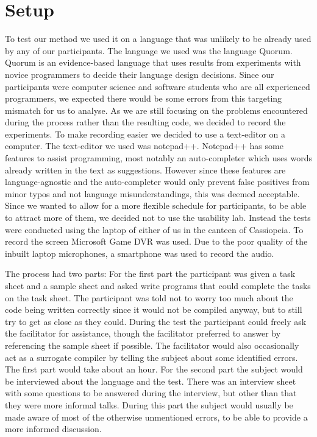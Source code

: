 \chapter{Setup}
To test our method we used it on a language that was unlikely to be already used by any of our participants.
The language we used was the language Quorum\cite{Quorum}.
Quorum is an evidence-based language that uses results from experiments with novice programmers to decide their language design decisions.
Since our participants were computer science and software students who are all experienced programmers, we expected there would be some errors from this targeting mismatch for us to analyse.
As we are still focusing on the problems encountered during the process rather than the resulting code, we decided to record the experiments.
To make recording easier we decided to use a text-editor on a computer.
The text-editor we used was notepad++\cite{Notepad}.
Notepad++ has some features to assist programming, most notably an auto-completer which uses words already written in the text as suggestions.
However since these features are language-agnostic and the auto-completer would only prevent false positives from minor typos and not language misunderstandings, this was deemed acceptable.%
Since we wanted to allow for a more flexible schedule for participants, to be able to attract more of them, we decided not to use the usability lab.
Instead the tests were conducted using the laptop of either of us in the canteen of Cassiopeia.
To record the screen Microsoft Game DVR was used.
Due to the poor quality of the inbuilt laptop microphones, a smartphone was used to record the audio.%

The process had two parts:
For the first part the participant was given a task sheet and a sample sheet and asked write programs that could complete the tasks on the task sheet.
The participant was told not to worry too much about the code being written correctly since it would not be compiled anyway, but to still try to get as close as they could.
During the test the participant could freely ask the facilitator for assistance, though the facilitator preferred to answer by referencing the sample sheet if possible.
The facilitator would also occasionally act as a surrogate compiler by telling the subject about some identified errors.%
The first part would take about an hour.
For the second part the subject would be interviewed about the language and the test.
There was an interview sheet with some questions to be answered during the interview, but other than that they were more informal talks.
During this part the subject would usually be made aware of most of the otherwise unmentioned errors, to be able to provide a more informed discussion.



